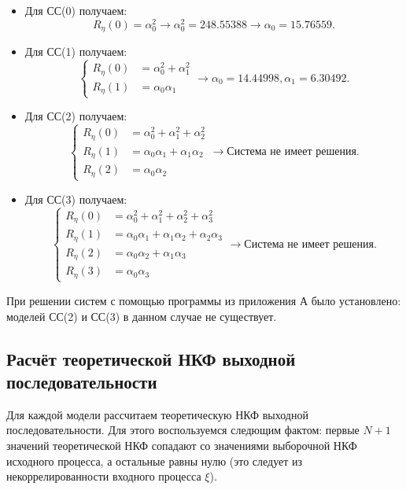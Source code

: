 \documentclass[12pt, fleqn]{article}
\begin{document}
{{{			\begin{itemize}
				\item {
					Для СС(0) получаем:
					\begin{equation*}
						R_{\eta}(0) = \alpha_0^2 \rightarrow \alpha_0^2 = 248.55388 \rightarrow \alpha_0 = 15.76559.
					\end{equation*}
				}
				\item {
					Для СС(1) получаем:
					\begin{equation*}
						\left\{
						\begin{split}
							R_{\eta}(0) &= \alpha_0^2 + \alpha_1^2 \\
							R_{\eta}(1) &= \alpha_0 \alpha_1
						\end{split}
						\right. \rightarrow \alpha_0 = 14.44998, \alpha_1 = 6.30492.
					\end{equation*}
				}
				\item {
					Для СС(2) получаем:
					\begin{equation*}
						\left\{
						\begin{split}
							R_{\eta}(0) &= \alpha_0^2 + \alpha_1^2 + \alpha_2^2 \\
							R_{\eta}(1) &= \alpha_0 \alpha_1 + \alpha_1 \alpha_2 \\
							R_{\eta}(2) &= \alpha_0 \alpha_2
						\end{split}
						\right. \rightarrow \text{Система не имеет решения}.
					\end{equation*}
				}
				\item {
					Для СС(3) получаем:
					\begin{equation*}
						\left\{
						\begin{split}
							R_{\eta}(0) &= \alpha_0^2 + \alpha_1^2 + \alpha_2^2 + \alpha_3^2 \\
							R_{\eta}(1) &= \alpha_0 \alpha_1 + \alpha_1 \alpha_2 + \alpha_2 \alpha_3 \\
							R_{\eta}(2) &= \alpha_0 \alpha_2 + \alpha_1 \alpha_3 \\
							R_{\eta}(3) &= \alpha_0 \alpha_3
						\end{split}
						\right. \rightarrow \text{Система не имеет решения}.
					\end{equation*}
				}				
			\end{itemize}
						
			При решении систем с помощью программы из приложения А было установлено: моделей СС(2) и СС(3) в данном случае не существует.
		}
		\subsection{Расчёт теоретической НКФ выходной последовательности} {
			Для каждой модели рассчитаем теоретическую НКФ выходной последовательности. Для этого воспользуемся следющим фактом: первые $N + 1$ значений теоретической НКФ сопадают со значениями выборочной НКФ исходного процесса, а остальные равны нулю (это следует из некоррелированности входного процесса $\xi$). \medskip
					
}}}
\end{document}
